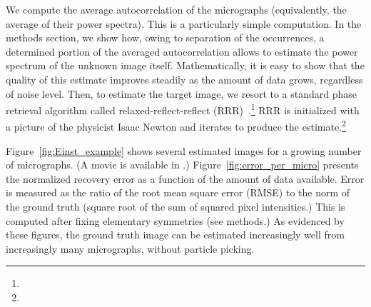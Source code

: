 \documentclass[english,11pt]{article}
\newcommand{\1}{\mathbf{1}}
\newcommand{\TODO}[1]{{\color{red}{[#1]}}}
\numberwithin{equation}{section}
\theoremstyle{plain}
\theoremstyle{definition}
\theoremstyle{remark}
\theoremstyle{plain}
\theoremstyle{remark}
\theoremstyle{plain}
\theoremstyle{plain}
\begin{document}
We compute the average autocorrelation of the micrographs (equivalently, the average of their power spectra). This is a particularly simple computation. In the methods section, we show how, owing to separation of the occurrences, a determined portion of the averaged autocorrelation allows to estimate the power spectrum of the unknown image itself. Mathematically, it is easy to show that the quality of this estimate improves steadily as the amount of data grows, regardless of noise level. Then, to estimate the target image, we resort to a standard phase retrieval algorithm called relaxed-reflect-reflect (RRR)~\cite{bauschke2004rrr,elser2017rrr}.\footnote{\TODO{Quid of symmetries?}} RRR is initialized with a picture of the physicist Isaac Newton and iterates to produce the estimate.\footnote{\TODO{Initializing with a face is debatable: it might help the algorithm. On the other hand, I agree that it supports the notion that we don't get trapped too easily.}}

Figure~\ref{fig:Einst_example} shows several estimated images for a growing number of micrographs. (A movie is available in \TODO{supplementary material}.) Figure~\ref{fig:error_per_micro} presents the normalized recovery error as a function of the amount of data available. Error is measured as the ratio of the root mean square error (RMSE) to the norm of the ground truth (square root of the sum of squared pixel intensities.) This is computed after fixing elementary symmetries (see methods.) As evidenced by these figures, the ground truth image can be estimated increasingly well from increasingly many micrographs, without particle picking.



\end{document}
